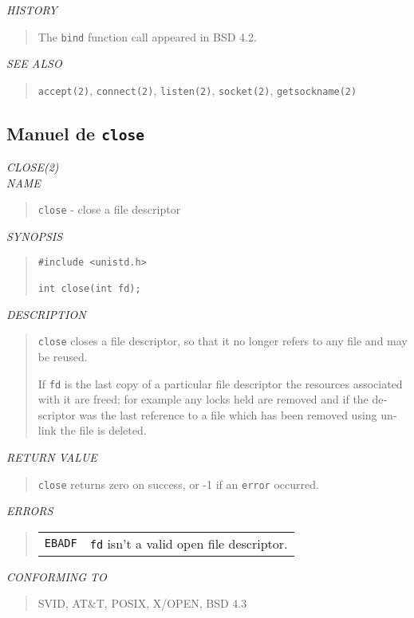 \begin{appendix}
\begin{english}
{\sl HISTORY}
\begin{quote}
	The {\tt bind} function call appeared in BSD 4.2.
\end{quote}

{\sl SEE ALSO}
\begin{quote}
	{\tt accept(2)}, {\tt connect(2)}, {\tt listen(2)}, {\tt socket(2)}, 
	{\tt getsockname(2)}
\end{quote}
\end{english}

\subsection{Manuel de {\tt close}}
\begin{english}
{\sl CLOSE(2)}\\

{\sl NAME}
\begin{quote}
	{\tt close} - close a file descriptor
\end{quote}

{\sl SYNOPSIS}
\begin{quote}
\begin{verbatim}
#include <unistd.h>

int close(int fd);
\end{verbatim}
\end{quote}

{\sl DESCRIPTION}
\begin{quote}
	{\tt close} closes a file descriptor, so that it no longer
	refers to any file and may be reused.

	If {\tt fd} is the last copy of a particular file descriptor the
	resources associated with it are freed; for example any
	locks held are removed and if the descriptor was the last
	reference to a file which has been removed using unlink
	the file is deleted.
\end{quote}

{\sl RETURN VALUE}
\begin{quote}
	{\tt close} returns zero on success, or -1 if an {\tt error} occurred.
\end{quote}

{\sl ERRORS}
\begin{quote}
\begin{tabular}{lp{8cm}}
	{\tt EBADF}	& {\tt fd} isn't a valid open file descriptor.
\end{tabular}
\end{quote}

{\sl CONFORMING TO}
\begin{quote}
	SVID, AT\&T, POSIX, X/OPEN, BSD 4.3
\end{quote}


\end{english}
\end{appendix}
